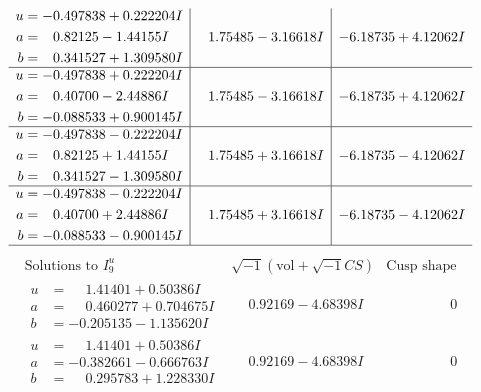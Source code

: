 \documentclass[1p]{elsarticle_modified}
\theoremstyle{definition}
\newcommand{\I}{\sqrt{-1}}
\begin{document}
$$\begin{array}{c|c|c}
\begin{aligned}
u &= -0.497838 + 0.222204 I \\
a &= \phantom{-}0.82125 - 1.44155 I \\
b &= \phantom{-}0.341527 + 1.309580 I\end{aligned}
 & \phantom{-}1.75485 - 3.16618 I & -6.18735 + 4.12062 I \\ \hline\begin{aligned}
u &= -0.497838 + 0.222204 I \\
a &= \phantom{-}0.40700 - 2.44886 I \\
b &= -0.088533 + 0.900145 I\end{aligned}
 & \phantom{-}1.75485 - 3.16618 I & -6.18735 + 4.12062 I \\ \hline\begin{aligned}
u &= -0.497838 - 0.222204 I \\
a &= \phantom{-}0.82125 + 1.44155 I \\
b &= \phantom{-}0.341527 - 1.309580 I\end{aligned}
 & \phantom{-}1.75485 + 3.16618 I & -6.18735 - 4.12062 I \\ \hline\begin{aligned}
u &= -0.497838 - 0.222204 I \\
a &= \phantom{-}0.40700 + 2.44886 I \\
b &= -0.088533 - 0.900145 I\end{aligned}
 & \phantom{-}1.75485 + 3.16618 I & -6.18735 - 4.12062 I\\
 \hline 
 \end{array}$$\newpage$$\begin{array}{c|c|c}  
\text{Solutions to }I^u_{9}& \I (\text{vol} + \sqrt{-1}CS) & \text{Cusp shape}\\
 \hline 
\begin{aligned}
u &= \phantom{-}1.41401 + 0.50386 I \\
a &= \phantom{-}0.460277 + 0.704675 I \\
b &= -0.205135 - 1.135620 I\end{aligned}
 & \phantom{-}0.92169 - 4.68398 I & \phantom{-0.000000 } 0 \\ \hline\begin{aligned}
u &= \phantom{-}1.41401 + 0.50386 I \\
a &= -0.382661 - 0.666763 I \\
b &= \phantom{-}0.295783 + 1.228330 I\end{aligned}
 & \phantom{-}0.92169 - 4.68398 I & \phantom{-0.000000 } 0 \\ \hline\begin{aligned}

\end{aligned}
\end{array}$$
\end{document}
